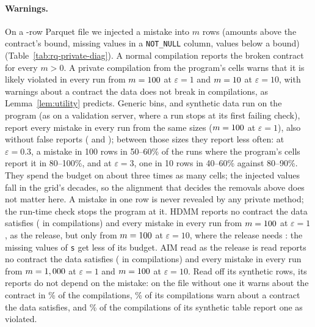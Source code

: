 \paragraph{Warnings.} On a \PrivDiagRows-row Parquet file we injected a mistake into $m$ rows (amounts
above the contract's bound, missing values in a \texttt{NOT\_NULL} column, values below a bound)
(Table~\ref{tab:rq-private-diag}). A normal compilation reports the broken contract for every $m > 0$. A
private compilation from the program's cells warns that it is likely violated in every run from
$m = 100$ at $\varepsilon = 1$ and $m = 10$ at $\varepsilon = 10$, with
\PrivDiagFalse{} warnings about a contract the data does not break in \PrivDiagCompilations{} compilations,
as Lemma~\ref{lem:utility} predicts. Generic bins, and synthetic data run on the program (as on a
validation server, where a run stops at its first failing check), report every mistake in every run from
the same sizes ($m = 100$ at $\varepsilon = 1$), also without false reports
(\PrivDiagGenericFalse{} and \PrivDiagSyntheticFalse{}); between those sizes they report less often: at
$\varepsilon = 0.3$, a mistake in 100 rows in 50--60\% of the runs where the program's cells report it in
80--100\%, and at $\varepsilon = 3$, one in 10 rows in 40--60\% against 80--90\%. They spend the budget on
about three times as many cells; the injected values fall in the grid's decades, so the alignment that
decides the removals above does not matter here. A mistake in one row is never revealed by any private
method; the run-time check stops the program at it. HDMM reports no contract the data satisfies
(\PrivDiagHdmmFalse{} in \PrivDiagHdmmCompilations{} compilations) and every mistake in every run from
$m = 100$ at $\varepsilon = 1$, as the release, but only from $m = 100$ at
$\varepsilon = 10$, where the release needs \PrivDiagEpsTen{}: the missing values of \texttt{s} get less of
its budget. AIM read as the release is read reports no contract the data satisfies
(\PrivDiagAimMargFalse{} in \PrivDiagAimMargCompilations{} compilations) and every mistake in every run from
$m = 1,000$ at $\varepsilon = 1$ and $m = 100$ at $\varepsilon = 10$. Read off
its synthetic rows, its reports do not depend on the mistake: on the file without one it warns about the
contract in \PrivDiagAimCleanWarned\% of the compilations, \PrivDiagAimFalseShare\% of its compilations warn
about a contract the data satisfies, and \PrivDiagAimSynFalseShare\% of the compilations of its synthetic
table report one as violated.

